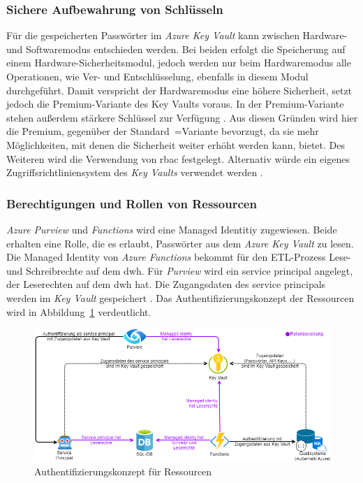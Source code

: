 \subsubsection{Sichere Aufbewahrung von Schlüsseln} \label{subsec:infra:konfig:keyVault}
Für die gespeicherten Passwörter im \textit{Azure Key Vault} kann zwischen Hardware- und Softwaremodus entschieden werden. Bei beiden erfolgt die Speicherung auf einem Hardware-Sicherheitsmodul, jedoch werden nur beim Hardwaremodus alle Operationen, wie Ver- und Entschlüsselung, ebenfalls in diesem Modul durchgeführt. Damit verspricht der Hardwaremodus eine höhere Sicherheit, setzt jedoch die Premium-Variante des Key Vaults voraus. In der Premium-Variante stehen außerdem stärkere Schlüssel zur Verfügung \cite{haunts_key_2019}. Aus diesen Gründen wird hier die Premium, gegenüber der Standard~=Variante bevorzugt, da sie mehr Möglichkeiten, mit denen die Sicherheit weiter erhöht werden kann, bietet. Des Weiteren wird die Verwendung von \ac{rbac} festgelegt. Alternativ würde ein eigenes Zugriffsrichtliniensystem des \textit{Key Vaults} verwendet werden \cite[vgl.][]{herath_azure_2022}.

\subsubsection{Berechtigungen und Rollen von Ressourcen} \label{subsec:infra:konfig:aad}
\textit{Azure Purview} und \textit{Functions} wird eine Managed Identitiy zugewiesen. Beide erhalten eine Rolle, die es erlaubt, Passwörter aus dem \textit{Azure Key Vault} zu lesen. Die Managed Identity von \textit{Azure Functions} bekommt für den ETL-Prozess Lese- und Schreibrechte auf dem \ac{dwh}. Für \textit{Purview} wird ein service principal angelegt, der Leserechten auf dem \ac{dwh} hat. Die Zugangsdaten des service principals werden im \textit{Key Vault} gespeichert \cite[vgl.][]{riscutia_data_2021}. Das Authentifizierungskonzept der Ressourcen wird in Abbildung~\ref{fig:chap04_ressourceAuth} verdeutlicht. 

 \begin{figure}[htbp]
 \centering
 \includegraphics[width=\textwidth]{gfx/ressource_auth.png}
 \caption[Authentifizierungskonzept für Ressourcen]{Authentifizierungskonzept für Ressourcen \cite[vgl.][]{riscutia_data_2021}}
\label{fig:chap04_ressourceAuth}
\end{figure}

